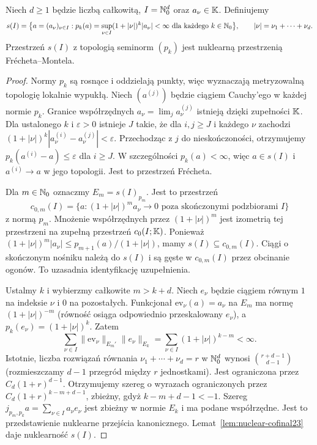 \begin{twierdzenie}
\label{thm:nuclear-s23}
Niech $d\ge1$ będzie liczbą całkowitą, $I=\mathbb N_0^d$
oraz $a_\nu\in\mathbb K$. Definiujemy
\[
 s(I)=\bigl\{a=(a_\nu)_{\nu\in I}:
 p_k(a)=\sup_{\nu\in I}(1+|\nu|)^k|a_\nu|<\infty
 \text{ dla każdego }k\in\mathbb N_0\bigr\},
 \qquad |\nu|=\nu_1+\cdots+\nu_d.
\]
Przestrzeń $s(I)$ z topologią seminorm $(p_k)$ jest
nuklearną przestrzenią Frécheta--Montela.
\end{twierdzenie}
\begin{proof}
Normy $p_k$ są rosnące i oddzielają punkty, więc
wyznaczają metryzowalną topologię lokalnie wypukłą.
Niech $(a^{(j)})$ będzie ciągiem Cauchy'ego w każdej
normie $p_k$. Granice współrzędnych
$a_\nu=\lim_j a_\nu^{(j)}$ istnieją dzięki zupełności $\mathbb K$.
Dla ustalonego $k$ i $\varepsilon>0$ istnieje $J$
takie, że dla $i,j\ge J$ i każdego $\nu$ zachodzi
$(1+|\nu|)^k|a_\nu^{(i)}-a_\nu^{(j)}|<\varepsilon$.
Przechodząc z $j$ do nieskończoności, otrzymujemy
$p_k(a^{(i)}-a)\le\varepsilon$ dla $i\ge J$.
W szczególności $p_k(a)<\infty$, więc $a\in s(I)$
i $a^{(i)}\to a$ w jego topologii. Jest to przestrzeń
Frécheta.

Dla $m\in\mathbb N_0$ oznaczmy $E_m=s(I)_{p_m}$.
Jest to przestrzeń
\[
 c_{0,m}(I)=\{a:(1+|\nu|)^m a_\nu\to0
 \text{ poza skończonymi podzbiorami }I\}
\]
z normą $p_m$. Mnożenie współrzędnych przez
$(1+|\nu|)^m$ jest izometrią tej przestrzeni na
zupełną przestrzeń $c_0(I;\mathbb K)$. Ponieważ
$(1+|\nu|)^m|a_\nu|\le p_{m+1}(a)/(1+|\nu|)$,
mamy $s(I)\subseteq c_{0,m}(I)$.
Ciągi o skończonym nośniku należą do $s(I)$
i są gęste w $c_{0,m}(I)$ przez obcinanie ogonów.
To uzasadnia identyfikację uzupełnienia.

Ustalmy $k$ i wybierzmy całkowite $m>k+d$.
Niech $e_\nu$ będzie ciągiem równym $1$ na indeksie $\nu$
i $0$ na pozostałych. Funkcjonał
$\mathrm{ev}_\nu(a)=a_\nu$ na $E_m$ ma normę
$(1+|\nu|)^{-m}$ (równość osiąga odpowiednio
przeskalowany $e_\nu$), a $p_k(e_\nu)=(1+|\nu|)^k$.
Zatem
\[
 \sum_{\nu\in I}\|\mathrm{ev}_\nu\|_{E_m'}
 \|e_\nu\|_{E_k}
 =\sum_{\nu\in I}(1+|\nu|)^{k-m}<\infty.
\]
Istotnie, liczba rozwiązań równania
$\nu_1+\cdots+\nu_d=r$ w $\mathbb N_0^d$ wynosi
$\binom{r+d-1}{d-1}$ (rozmieszczamy $d-1$
przegród między $r$ jednostkami).
Jest ograniczona przez $C_d(1+r)^{d-1}$.
Otrzymujemy szereg o wyrazach ograniczonych przez
$C_d(1+r)^{k-m+d-1}$, zbieżny, gdyż
$k-m+d-1<-1$. Szereg
$j_{p_m,p_k}a=\sum_{\nu\in I}a_\nu e_\nu$
jest zbieżny w normie $E_k$ i ma podane współrzędne.
Jest to przedstawienie nuklearne przejścia kanonicznego.
Lemat~\ref{lem:nuclear-cofinal23} daje nuklearność $s(I)$.


\end{proof}

